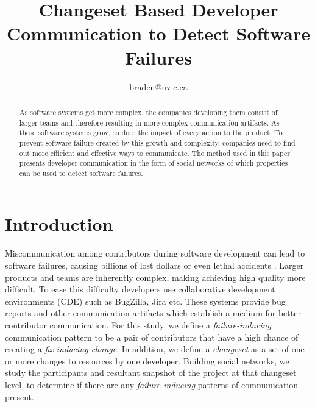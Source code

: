 \documentclass[conference]{IEEEtran}
\begin{document}
\title{Changeset Based Developer Communication to Detect Software Failures}

\author{
braden@uvic.ca}

\maketitle

\begin{abstract}
As software systems get more complex, the companies developing them consist of larger teams and therefore resulting in more complex communication artifacts.  As these software systems grow, so does the impact of every action to the product.  To prevent software failure created by this growth and complexity, companies need to find out more efficient and effective ways to communicate.  The method used in this paper presents developer communication in the form of social networks of which properties can be used to detect software failures.\end{abstract}

\section{Introduction}

Miscommunication among contributors during software development can lead to software failures, causing billions of lost dollars or even lethal accidents \cite{Wolf:2009:PBF:1555001.1555017}. Larger products and teams
are inherently complex, making achieving high quality more difﬁcult. To ease this difﬁculty developers use collaborative development environments (CDE) such as BugZilla, Jira etc. These systems provide bug reports and other communication artifacts which establish a medium for better contributor communication. For this study, we deﬁne a \emph{failure-inducing} communication pattern to be a pair of contributors that have a high chance of creating a \emph{fix-inducing change}.  In addition, we define a \emph{changeset} as a set of one or more changes to resources by one developer.  Building social networks, we study the participants and resultant snapshot of the project at that changeset level, to determine if there are any \emph{failure-inducing} patterns of communication present.
\end{document}
